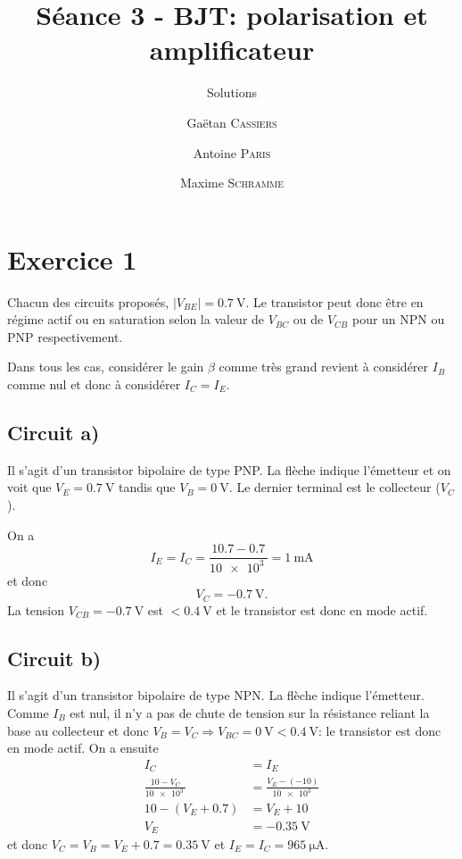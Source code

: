 \documentclass[frenchb,DIV=13]{scrartcl}
\title{Séance 3 - BJT: polarisation et amplificateur}
\subtitle{Solutions}
\author{\small Gaëtan \textsc{Cassiers} \and\small Antoine \textsc{Paris} \and\small Maxime
\textsc{Schramme}}
\date{}
\begin{document}
\maketitle

\section*{Exercice 1}
Chacun des circuits proposés, $|V_{BE}| = \SI{0.7}{\volt}$. Le transistor peut
donc être en régime actif ou en saturation selon la valeur de $V_{BC}$ ou de
$V_{CB}$ pour un NPN ou PNP respectivement.

Dans tous les cas, considérer le gain $\beta$ comme très grand revient à considérer
$I_B$ comme nul et donc à considérer $I_C = I_E$.

\subsection*{Circuit a)} 
Il s'agit d'un transistor bipolaire de type PNP. La flèche indique l'émetteur et
on voit que $V_E = \SI{0.7}{\volt}$ tandis que $V_B = \SI{0}{\volt}$.
Le dernier terminal est le collecteur ($V_C$).

On a
\[ I_E = I_C = \frac{10.7-0.7}{\SI{10e3}{}} = \SI{1}{\milli\ampere} \]
et donc
\[ V_C = \SI{-0.7}{\volt}. \]
La tension $V_{CB} = \SI{-0.7}{\volt}$ est $< \SI{0.4}{\volt}$ et le transistor
est donc en mode actif.

\subsection*{Circuit b)}
Il s'agit d'un transistor bipolaire de type NPN. La flèche indique l'émetteur.
Comme $I_B$ est nul, il n'y a pas de chute de tension sur la résistance reliant
la base au collecteur et donc $V_B = V_C \Rightarrow V_{BC} = \SI{0}{\volt} < \SI{0.4}{\volt}$:
le transistor est donc en mode actif. On a ensuite
\begin{align*}
	I_C &= I_E \\
	\frac{10-V_C}{\SI{10e3}{}} &= \frac{V_E - (-10)}{\SI{10e3}{}} \\
	10 - (V_E + 0.7) &= V_E + 10 \\
	V_E &= -\SI{0.35}{\volt}
\end{align*}
et donc $V_C = V_B = V_E+0.7 = \SI{0.35}{\volt}$ et $I_E = I_C = \SI{965}{\micro\ampere}$.
\end{document}
